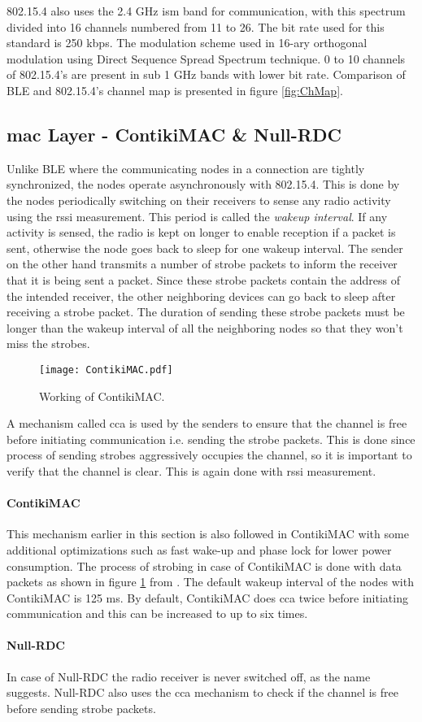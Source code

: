 802.15.4 also uses the 2.4 GHz \gls{ism} band for communication, with this spectrum divided into 16 channels numbered from 11 to 26. The bit rate used for this standard is 250 kbps. The modulation scheme used in 16-ary orthogonal modulation using Direct Sequence Spread Spectrum technique. 0 to 10 channels of 802.15.4's are present in sub 1 GHz bands with lower bit rate. Comparison of BLE and 802.15.4's channel map is presented in figure \ref{fig:ChMap}.

\subsection{\texorpdfstring{\gls{mac}}{MAC} Layer - ContikiMAC \& Null-RDC}

Unlike BLE where the communicating nodes in a connection are tightly synchronized, the nodes operate asynchronously with 802.15.4. This is done by the nodes periodically switching on their receivers to sense any radio activity using the \gls{rssi} measurement. This period is called the \emph{wakeup interval}. If any activity is sensed, the radio is kept on longer to enable reception if a packet is sent, otherwise the node goes back to sleep for one wakeup interval. The sender on the other hand transmits a number of strobe packets to inform the receiver that it is being sent a packet. Since these strobe packets contain the address of the intended receiver, the other neighboring devices can go back to sleep after receiving a strobe packet. The duration of sending these strobe packets must be longer than the wakeup interval of all the neighboring nodes so that they won't miss the strobes.

\begin{figure}[tb]
\centering
\texttt{[image: ContikiMAC.pdf]}
\caption{Working of ContikiMAC.}
\label{fig:ContikiMAC}
\end{figure}

A mechanism called \gls{cca} is used by the senders to ensure that the channel is free before initiating communication i.e. sending the strobe packets. This is done since process of sending strobes aggressively occupies the channel, so it is important to verify that the channel is clear. This is again done with \gls{rssi} measurement.

\paragraph{ContikiMAC}
This mechanism earlier in this section is also followed in ContikiMAC with some additional optimizations such as fast wake-up and phase lock for lower power consumption. The process of strobing in case of ContikiMAC is done with data packets as shown in figure \ref{fig:ContikiMAC} from  \cite{Dunkels2011}. The default wakeup interval of the nodes with ContikiMAC is 125 ms. By default, ContikiMAC does \gls{cca} twice before initiating communication and this can be increased to up to six times.

\paragraph{Null-RDC}
In case of Null-RDC the radio receiver is never switched off, as the name suggests. Null-RDC also uses the \gls{cca} mechanism to check if the channel is free before sending strobe packets.
